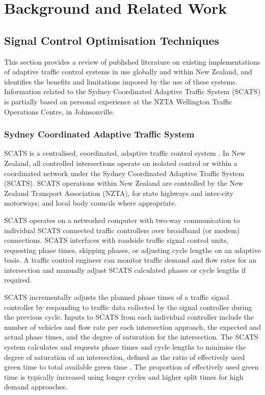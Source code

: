 \chapter{Background and Related Work}

\section{Signal Control Optimisation Techniques}

This section provides a review of published literature on existing implementations of adaptive traffic control systems in use globally and within New Zealand, and identifies the benefits and limitations imposed by the use of these systems. Information related to the Sydney Coordinated Adaptive Traffic System (SCATS) is partially based on personal experience at the NZTA Wellington Traffic Operations Centre, in Johnsonville. 

\subsection{Sydney Coordinated Adaptive Traffic System}

SCATS is a centralised, coordinated, adaptive traffic control system \cite{lowrie1982scats}. In New Zealand, all controlled intersections operate on isolated control or within a coordinated network under the Sydney Coordinated Adaptive Traffic System (SCATS). SCATS operations within New Zealand are controlled by the New Zealand Transport Association (NZTA), for state highways and inter-city motorways; and local body councils where appropriate.

 SCATS operates on a networked computer with two-way communication to individual SCATS connected traffic controllers over broadband (or modem) connections. SCATS interfaces with roadside traffic signal control units, requesting phase times, skipping phases, or adjusting cycle lengths on an adaptive basis. A traffic control engineer can monitor traffic demand and flow rates for an intersection and manually adjust SCATS calculated phases or cycle lengths if required.

SCATS incrementally adjusts the planned phase times of a traffic signal controller by responding to traffic data collected by the signal controller during the previous cycle. Inputs to SCATS from each individual controller include the number of vehicles and flow rate per each intersection approach, the expected and actual phase times, and the degree of saturation for the intersection.  The SCATS system calculates and requests phase times and cycle lengths to minimise the degree of saturation of an intersection, defined as the ratio of effectively used green time to total available green time \cite{wolshon1999scats}. The proportion of effectively used green time is typically increased using longer cycles and higher split times for high demand approaches. 


